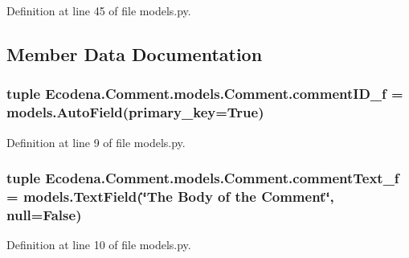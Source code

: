 Definition at line 45 of file models.py.



\subsection{Member Data Documentation}
\hypertarget{class_ecodena_1_1_comment_1_1models_1_1_comment_aa6f9647f3c5bc90f1d4b3c71e91b1851}{
\subsubsection[{commentID\_\-f}]{\setlength{\rightskip}{0pt plus 5cm}tuple {\bf Ecodena.Comment.models.Comment.commentID\_\-f} = models.AutoField(primary\_\-key=True)}}
\label{d9/d86/class_ecodena_1_1_comment_1_1models_1_1_comment_aa6f9647f3c5bc90f1d4b3c71e91b1851}


Definition at line 9 of file models.py.

\hypertarget{class_ecodena_1_1_comment_1_1models_1_1_comment_a808da2fbfcfee13f0474d8d929b17181}{
\subsubsection[{commentText\_\-f}]{\setlength{\rightskip}{0pt plus 5cm}tuple {\bf Ecodena.Comment.models.Comment.commentText\_\-f} = models.TextField(\char`\"{}The Body of the {\bf Comment}\char`\"{}, null=False)}}
\label{d9/d86/class_ecodena_1_1_comment_1_1models_1_1_comment_a808da2fbfcfee13f0474d8d929b17181}


Definition at line 10 of file models.py.

\hypertarget{class_ecodena_1_1_comment_1_1models_1_1_comment_ad5b1fd7419be638d296dad50d7336798}{
\subsubsection[{commentText\_\-f}]{}}
\label{d9/d86/class_ecodena_1_1_comment_1_1models_1_1_comment_ad5b1fd7419be638d296dad50d7336798}


